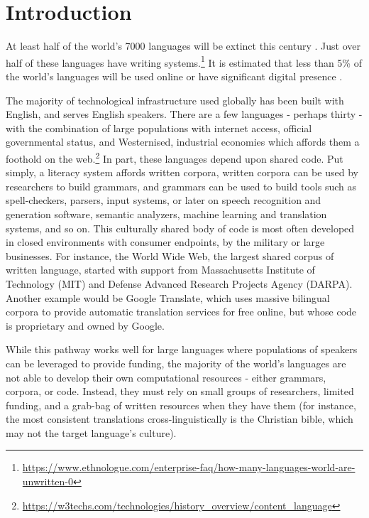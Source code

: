 \section{Introduction}\label{sec:intro}

At least half of the world's 7000 languages will be extinct this century \citep[p. 27]{grenoble_2011}. Just over half of these languages have writing systems.\footnote{\href{https://www.ethnologue.com/enterprise-faq/how-many-languages-world-are-unwritten-0}{https://www.ethnologue.com/enterprise-faq/how-many-languages-world-are-unwritten-0}} It is estimated that less than 5\% of the world's languages will be used online or have significant digital presence \citep{kornai2013digital}.

The majority of technological infrastructure used globally has been built with English, and serves English speakers. There are a few languages - perhaps thirty - with the combination of large populations with internet access, official governmental status, and Westernised, industrial economies which affords them a foothold on the web.\footnote{\href{https://w3techs.com/technologies/history\_overview/content\_language}{https://w3techs.com/technologies/history\_overview/content\_language}}
In part, these languages depend upon shared code. Put simply, a literacy system affords written corpora, written corpora can be used by researchers to build grammars, and grammars can be used to build tools such as spell-checkers, parsers, input systems, or later on speech recognition and generation software, semantic analyzers, machine learning and translation systems, and so on. This culturally shared body of code is most often developed in closed environments with consumer endpoints, by the military or large businesses. For instance, the World Wide Web, the largest shared corpus of written language, started with support from  Massachusetts Institute of Technology (MIT) and  Defense Advanced Research Projects Agency (DARPA). Another example would be Google Translate, which uses massive bilingual corpora to provide automatic translation services for free online, but whose code is proprietary and owned by Google.

While this pathway works well for large languages where populations of speakers can be leveraged to provide funding, the majority of the world's languages are not able to develop their own computational resources - either grammars, corpora, or code. Instead, they must rely on small groups of researchers, limited funding, and a grab-bag of written resources when they have them (for instance, the most consistent translations cross-linguistically is the Christian bible, which may not the target language's culture).

